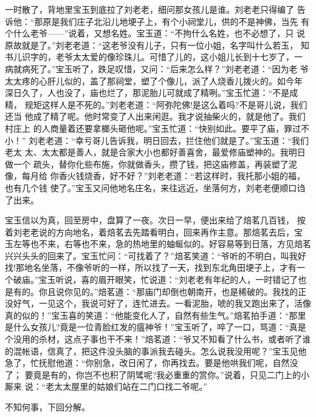 一时散了，背地里宝玉到底拉了刘老老，细问那女孩儿是谁。刘老老只得编了
告诉他：“那原是我们庄子北沿儿地埂子上，有个小祠堂儿，供的不是神佛，当先
有个什么老爷——”说着，又想名姓。宝玉道：“不拘什么名姓，也不必想了，只
说原故就是了。”刘老老道：“这老爷没有儿子，只有一位小姐，名字叫什么若玉，
知书儿识字的，老爷太太爱的像珍珠儿。可惜了儿的，这小姐儿长到十七岁了，一
病就病死了。”宝玉听了，跌足叹惜，又问：“后来怎么样？”刘老老道：“因为老
爷太太疼的心肝儿似的，盖了那祠堂，塑了个像儿，派了人烧香儿拨火的。如今年
深日久了，人也没了，庙也烂了，那泥胎儿可就成了精咧。”宝玉忙道：“不是成精，
规矩这样人是不死的。”刘老老道：“阿弥陀佛!是这么着吗?不是哥儿说，我们还当
他成了精了呢。他时常变了人出来闲逛。我才说抽柴火的，就是他了。我们村庄上
的人商量着还要拿榔头砸他呢。”宝玉忙道：“快别如此。要平了庙，罪过不小！”
刘老老道：“幸亏哥儿告诉我，明日回去，拦住他们就是了。”宝玉道：“我们老太
太、太太都是善人，就是合家大小也都好善喜舍，最爱修庙塑神的。我明日做一个
疏头，替你化些布施，你就做香头，攒了钱，把这庙修盖，再装塑了泥像，每月给
你香火钱烧香，好不好？”刘老老道：“若这样时，我托那小姐的福，也有几个钱
使了。”宝玉又问他地名庄名，来往远近，坐落何方，刘老老便顺口诌了出来。

宝玉信以为真，回至房中，盘算了一夜。次日一早，便出来给了焙茗几百钱，
按着刘老老说的方向地名，着焙茗去先踏看明白，回来再作主意。那焙茗去后，宝
玉左等也不来，右等也不来，急的热地里的蚰蜒似的。好容易等到日落，方见焙茗
兴兴头头的回来了。宝玉忙问：“可找着了？”焙茗笑道：“爷听的不明白，叫我好
找!那地名坐落，不像爷听的一样，所以找了一天，找到东北角田埂子上，才有一
个破庙。”宝玉听说，喜的眉开眼笑，忙说道：“刘老老有年纪的人，一时错记了也
是有的。你且说你见的。”焙茗道：“那庙门却倒也朝南开，也是稀破的。我找的正
没好气，一见这个，我说可好了，连忙进去。一看泥胎，唬的我又跑出来了，活像
真的似的！”宝玉喜的笑道：“他能变化人了，自然有些生气。”焙茗拍手道：“那里
是什么女孩儿?竟是一位青脸红发的瘟神爷！”宝玉听了，啐了一口，骂道：“真是
个没用的杀材，这点子事也干不来！”焙茗道：“爷又不知看了什么书，或者听了谁
的混帐语，信真了，把这件没头脑的事派我去碰头。怎么说我没用呢？”宝玉见他
急了，忙抚慰他道：“你别急，改日闲了，你再找去。要是他哄我们呢，自然没了；
要竟是有的，你岂不也积了阴骘呢?我必重重的赏你。”说着，只见二门上的小厮来
说：“老太太屋里的姑娘们站在二门口找二爷呢。”

不知何事，下回分解。